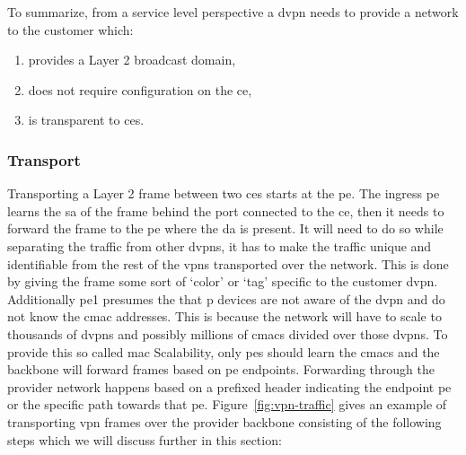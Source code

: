 To summarize, from a service level perspective a \ac{dvpn} needs to provide a network to the customer which:

\begin{enumerate}
	\item provides a Layer 2 broadcast domain,
	\item does not require configuration on the \ac{ce},
	\item is transparent to \acp{ce}.
\end{enumerate}


\subsubsection{Transport} %
\label{ssub:transport}

Transporting a Layer 2 frame between two \acp{ce} starts at the \ac{pe}. The ingress \ac{pe} learns the \ac{sa} of the frame behind the port connected to the \ac{ce}, then it needs to forward the frame to the \ac{pe} where the \ac{da} is present. It will need to do so while separating the traffic from other \acp{dvpn}, it has to make the traffic unique and identifiable from the rest of the \acp{vpn} transported over the network. This is done by giving the frame some sort of `color' or `tag' specific to the customer \ac{dvpn}. Additionally \ac{pe}1 presumes the that \ac{p} devices are not aware of the \ac{dvpn} and do not know the \ac{cmac} addresses. This is because the network will have to scale to thousands of \acp{dvpn} and possibly millions of \acp{cmac} divided over those \acp{dvpn}. To provide this so called \acs{mac} Scalability, only \acp{pe} should learn the \acp{cmac} and the backbone will forward frames based on \ac{pe} endpoints. Forwarding through the provider network happens based on a prefixed header indicating the endpoint \ac{pe} or the specific path towards that \ac{pe}. Figure~\ref{fig:vpn-traffic} gives an example of transporting \ac{vpn} frames over the provider backbone consisting of the following steps which we will discuss further in this section:

